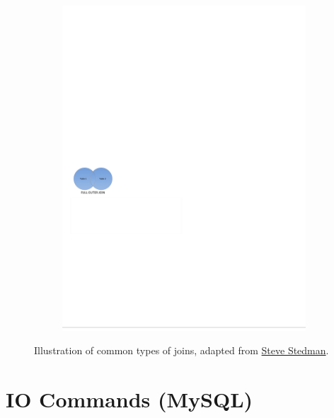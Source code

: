 \begin{figure}[H]
\begin{subfigure}[c]{0.3\textwidth}
  \includegraphics[width=\textwidth]{figures/sql/full_outer_join.pdf}
  \label{fig:sql:joins:full_outer_join}
  \end{subfigure}
\caption{
Illustration of common types of joins, adapted from \href{http://stevestedman.com/2015/03/sql-server-join-types-poster-version-2}{Steve Stedman}.
}
\label{fig:sql:joins}
\end{figure}

\section{IO Commands (MySQL)}
\label{sql:io}

